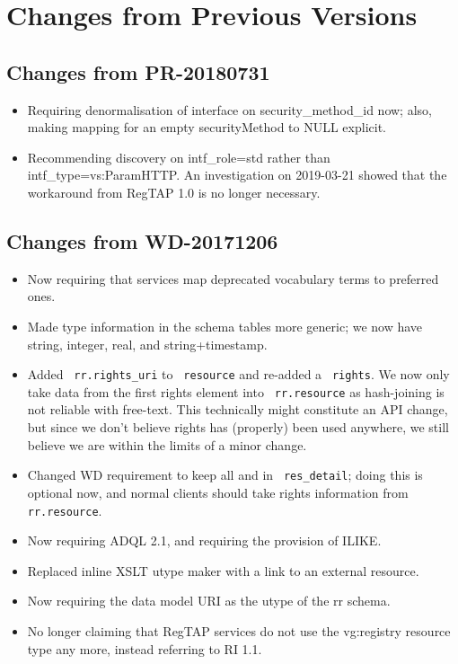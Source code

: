\documentclass[11pt,a4paper]{ivoa}
\newcommand{\rtent}[1]{\texttt{\color{rtcolor} #1}}
\begin{document}
\section{Changes from Previous Versions}

\label{changes}

\subsection{Changes from PR-20180731}

\begin{itemize}
\item Requiring denormalisation of interface on security\_method\_id
now; also, making mapping for an empty securityMethod to NULL explicit.
\item Recommending discovery on intf\_role=std rather than
intf\_type=vs:ParamHTTP.  An investigation on 2019-03-21 showed that the
workaround from RegTAP 1.0 is no longer necessary.
\end{itemize}

\subsection{Changes from WD-20171206}

\begin{itemize}
\item Now requiring that services map deprecated vocabulary terms to
preferred ones.
\item Made type information in the schema tables more generic; we now
have string, integer, real, and string+timestamp.
\item Added \rtent{rr.rights\_uri} to \rtent{resource} and re-added a
\rtent{rights}.  We now only take data from the first rights element
into \rtent{rr.resource} as hash-joining is not reliable with free-text.
This technically might constitute an API change, but since we don't
believe rights has (properly) been used anywhere, we still believe we are
within the limits of a minor change.
\item  Changed WD requirement to keep all  and
 in \rtent{res\_detail}; doing this is optional now,
and normal clients should take rights information from
\rtent{rr.resource}.
\item Now requiring ADQL 2.1, and requiring the provision of ILIKE.
\item Replaced inline XSLT utype maker with a link to an external
resource.
\item Now requiring the data model URI as the utype of the rr schema.
\item No longer claiming that RegTAP services do not use the vg:registry
resource type any more, instead referring to RI 1.1.
\end{itemize}
\end{document}
